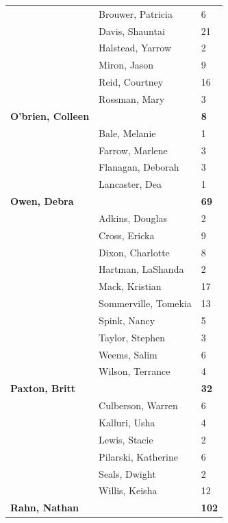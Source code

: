 \documentclass{article}\usepackage[]{graphicx}\usepackage[]{color}
\begin{document}
{\begin{longtable} { >{\raggedright}p{}|p{}p{}}
   \rowcolor[gray]{0.90} & Brouwer, Patricia & 6 \\ 
   \rowcolor[gray]{0.90} & Davis, Shauntai & 21 \\ 
   \rowcolor[gray]{0.90} & Halstead, Yarrow & 2 \\ 
   & Miron, Jason & 9 \\ 
   & Reid, Courtney & 16 \\ 
   & Rossman, Mary & 3 \\ 
   \rowcolor[gray]{0.90}\textbf{O'brien, Colleen} &  & \hspace{2cm}\textbf{8} \\ 
   \rowcolor[gray]{0.90} & Bale, Melanie & 1 \\ 
   \rowcolor[gray]{0.90} & Farrow, Marlene & 3 \\ 
   & Flanagan, Deborah & 3 \\ 
   & Lancaster, Dea & 1 \\ 
  \textbf{Owen, Debra} &  & \hspace{2cm}\textbf{69} \\ 
   \rowcolor[gray]{0.90} & Adkins, Douglas & 2 \\ 
   \rowcolor[gray]{0.90} & Cross, Ericka & 9 \\ 
   \rowcolor[gray]{0.90} & Dixon, Charlotte & 8 \\ 
   & Hartman, LaShanda & 2 \\ 
   & Mack, Kristian & 17 \\ 
   & Sommerville, Tomekia & 13 \\ 
   \rowcolor[gray]{0.90} & Spink, Nancy & 5 \\ 
   \rowcolor[gray]{0.90} & Taylor, Stephen & 3 \\ 
   \rowcolor[gray]{0.90} & Weems, Salim & 6 \\ 
   & Wilson, Terrance & 4 \\ 
  \textbf{Paxton, Britt} &  & \hspace{2cm}\textbf{32} \\ 
   & Culberson, Warren & 6 \\ 
   \rowcolor[gray]{0.90} & Kalluri, Usha & 4 \\ 
   \rowcolor[gray]{0.90} & Lewis, Stacie & 2 \\ 
   \rowcolor[gray]{0.90} & Pilarski, Katherine & 6 \\ 
   & Seals, Dwight & 2 \\ 
   & Willis, Keisha & 12 \\ 
  \textbf{Rahn, Nathan} &  & \hspace{2cm}\textbf{102} \\ 

\end{longtable}}
\end{document}
